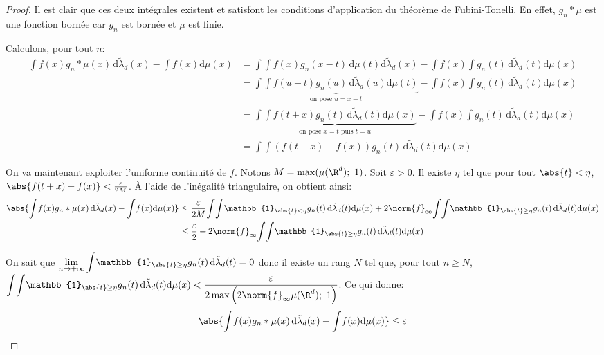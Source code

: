 \begin{proof}
Il est clair que ces deux intégrales existent et satisfont les conditions d'application du théorème de Fubini-Tonelli. En effet, $g_n * \mu$ est une fonction bornée car $g_n$ est bornée et $\mu$ est finie.

Calculons, pour tout $n$:
\begin{align*}
\displaystyle{\int} f(x) g_n * \mu (x) \, \mathrm d \tilde{\lambda}_d(x) - \displaystyle{\int} f(x) \mathrm d \mu(x) & = \displaystyle{\int} \displaystyle{\int} f(x) g_n(x-t) \, \mathrm d \mu(t) \mathrm d \tilde{\lambda}_d(x) -  \displaystyle{\int} f(x) \displaystyle{\int} g_n(t) \, \mathrm d \tilde{\lambda}_d(t) \mathrm d \mu(x) \\
  & = \underbrace{\displaystyle{\int} \displaystyle{\int} f(u+t) g_n(u) \, \mathrm d \tilde{\lambda}_d(u) \mathrm d \mu(t)}_{\text{on  pose } u = x-t} -  \displaystyle{\int} f(x) \displaystyle{\int} g_n(t) \, \mathrm d \tilde{\lambda}_d(t) \mathrm d \mu(x) \\
  & = \underbrace{\displaystyle{\int} \displaystyle{\int} f(t+x) g_n(t) \, \mathrm d \tilde{\lambda}_d(t) \mathrm d \mu(x)}_{\text{on  pose } x = t  \text{ puis } t = u} -  \displaystyle{\int} f(x) \displaystyle{\int} g_n(t) \, \mathrm d \tilde{\lambda}_d(t) \mathrm d \mu(x) \\  
  & = \displaystyle{\int} \displaystyle{\int} (f(t+x) - f(x)) g_n(t) \, \mathrm d \tilde{\lambda}_d(t) \mathrm d \mu(x)  
\end{align*}

On va maintenant exploiter l'uniforme continuité de $f$. Notons $M = \max(\mu(\R^d);~1)$. Soit $\varepsilon>0$. Il existe $\eta$ tel que pour tout $\abs{t}<\eta$, $\abs{f(t+x) - f(x)} < \frac{\varepsilon}{2M}$. À l'aide de l'inégalité triangulaire, on obtient ainsi:
\begin{multline*}
\abs{\displaystyle{\int} f(x) g_n * \mu (x) \, \mathrm d \tilde{\lambda}_d(x) - \displaystyle{\int} f(x) \mathrm d \mu(x)} \leq \frac{\varepsilon}{2M} \displaystyle{\int} \displaystyle{\int}  \mathbb{1}_{\abs{t}<\eta} g_n(t) \, \mathrm d \tilde{\lambda}_d(t) \mathrm d \mu(x) + 2 \norm{f}_{\infty} \displaystyle{\int} \displaystyle{\int}  \mathbb{1}_{\abs{t} \geq \eta} g_n(t) \, \mathrm d \tilde{\lambda}_d(t) \mathrm d \mu(x) \\
\leq \frac{\varepsilon}{2} + 2 \norm{f}_{\infty} \displaystyle{\int} \displaystyle{\int}  \mathbb{1}_{\abs{t} \geq \eta} g_n(t) \, \mathrm d \tilde{\lambda}_d(t) \mathrm d \mu(x)
\end{multline*}

On sait que $\lim \limits_{n \to +\infty} \displaystyle{\int}  \mathbb{1}_{\abs{t} \geq \eta} g_n(t) \, \mathrm d \tilde{\lambda}_d(t) = 0$ donc il existe un rang $N$ tel que, pour tout $n \geq N$,\\
$\displaystyle{\int} \displaystyle{\int}  \mathbb{1}_{\abs{t} \geq \eta} g_n(t) \, \mathrm d \tilde{\lambda}_d(t) \mathrm d \mu(x) < \frac{\varepsilon}{2\max\left ( 2\norm{f}_{\infty} \mu(\R^d);~1\right )}$. Ce qui donne:
\[
\abs{\displaystyle{\int} f(x) g_n * \mu (x) \, \mathrm d \tilde{\lambda}_d(x) - \displaystyle{\int} f(x) \mathrm d \mu(x)} \leq \varepsilon
\]
\end{proof}

